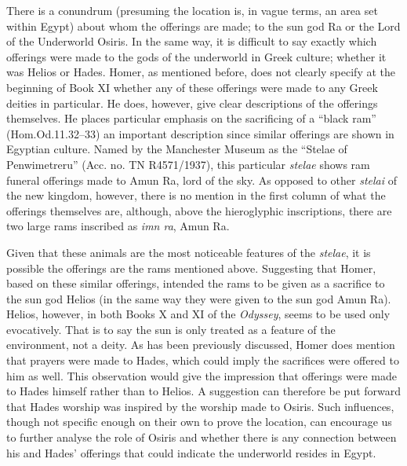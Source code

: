 	There is a conundrum (presuming the location is, in vague terms, an area set within Egypt) about whom the offerings are made; to the sun god Ra or the Lord of the Underworld Osiris. In the same way, it is difficult to say exactly which offerings were made to the gods of the underworld in Greek culture; whether it was Helios or Hades. Homer, as mentioned before, does not clearly specify at the beginning of Book XI whether any of these offerings were made to any Greek deities in particular. He does, however, give clear descriptions of the offerings themselves. He places particular emphasis on the sacrificing of a “black ram” (Hom.Od.11.32–33) an important description since similar offerings are shown in Egyptian culture. Named by the Manchester Museum as the “Stelae of Penwimetreru” (Acc. no. TN R4571/1937), this particular \emph{stelae} shows ram funeral offerings made to Amun Ra, lord of the sky. As opposed to other \emph{stelai} of the new kingdom, however, there is no mention in the first column of what the offerings themselves are, although, above the hieroglyphic inscriptions, there are two large rams inscribed as \emph{imn ra}, Amun Ra.
	
	Given that these animals are the most noticeable features of the \emph{stelae}, it is possible the offerings are the rams mentioned above. Suggesting that Homer, based on these similar offerings, intended the rams to be given as a sacrifice to the sun god Helios (in the same way they were given to the sun god Amun Ra). Helios, however, in both Books X and XI of the \emph{Odyssey}, seems to be used only evocatively. That is to say the sun is only treated as a feature of the environment, not a deity. As has been previously discussed, Homer does mention that prayers were made to Hades, which could imply the sacrifices were offered to him as well. This observation would give the impression that offerings were made to Hades himself rather than to Helios. A suggestion can therefore be put forward that Hades worship was inspired by the worship made to Osiris. Such influences, though not specific enough on their own to prove the location, can encourage us to further analyse the role of Osiris and whether there is any connection between his and Hades’ offerings that could indicate the underworld resides in Egypt.
	
